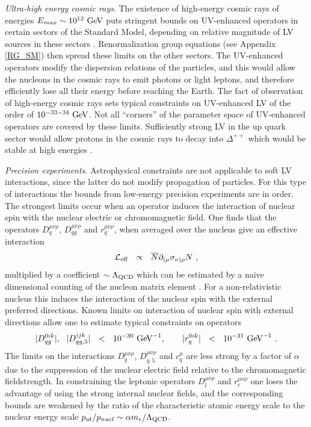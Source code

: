 \documentclass[12pt,preprintnumbers,nofootinbib]{revtex4}
\newcommand{\ov}{\overline}
\newcommand{\GeV}{{\rm GeV}}
\newcommand{\Leff}{{\mathcal{L}_{\rm eff}}}
\newcommand{\LQCD}{{\Lambda_{\rm QCD}}}
\begin{document}
	{\it Ultra-high energy cosmic rays}. 
	The existence of high-energy cosmic rays of energies $ E_{max} \sim 10^{12}~\GeV $ puts
	stringent bounds on UV-enhanced operators in certain sectors of the Standard Model, 
	depending on relative magnitude of LV sources in these sectors
	\cite{Gagnon:2004xh}. 
	Renormalization group equations (see Appendix \ref{RG_SM}) then spread these limits on the 
	other sectors.
	The UV-enhanced operators modify the dispersion relations of the particles, and this would 
	allow the nucleons in the cosmic rays to emit photons or light leptons, and therefore
	efficiently  lose all their energy before reaching the Earth. 
	The fact of observation of high-energy cosmic rays sets typical constraints on UV-enhanced
	LV of the order of $ 10^{-33-34}~\GeV $. 
	Not all ``corners'' of the parameter space of UV-enhanced operators are covered by these
	limits.
	Sufficiently strong LV in the up quark sector would allow protons in the cosmic
	rays to decay into $ \Delta^{++} $ which would be stable at high energies
	\cite{Gagnon:2004xh}.
	
	{\it Precision experiments}. 
	Astrophysical constraints are not applicable to soft LV interactions, since the latter do not
	modify propagation of particles.
	For this type of interactions the bounds from low-energy precision experiments are in order.
	The strongest limits occur when an operator induces the interaction 
	of nuclear spin with the nuclear electric 
	or chromomagnetic field. 
	One finds that the operators $ D_q^{\mu\nu\rho} $, $ D_{qg}^{\mu\nu\rho} $ 
	and $ r_q^{\mu\nu\rho} $, 
	when averaged over the nucleus give an effective interaction
\[
	\Leff ~~\propto~~ \ov{N} \partial_{(\mu} \sigma_{\nu)\rho} N ~,
\]
	multiplied by a coefficient $ \sim \LQCD $ which can be estimated by a naive dimensional
	counting of the nucleon matrix element
\cite{Manohar:1983md}.
	For a non-relativistic nucleus this induces the interaction of the nuclear spin with
	the external preferred directions.
	Known limits
\cite{Berglund:}
	on interaction of nuclear spin with external directions allow one to estimate typical
	constraints on operators
\[
	| D_{qg}^{0ik} |, ~~| D_{qg,5}^{ijk} |  ~~<~~ 10^{-30}~\GeV^{-1},
	\qquad
	| r_q^{0ik} | ~~<~~ 10^{-31}~\GeV^{-1}~.
\]
	The limits on the interactions $ D_q^{\mu\nu\rho} $, $ D_{q,5}^{\mu\nu\rho} $ and
	$ c_q^\mu $ are less strong by a factor of $ \alpha $ due to the suppression of the
	nuclear electric field relative to the chromomagnetic fieldstrength.
	In constraining the leptonic operators $ D_l^{\mu\nu\rho} $ and $ r_e^{\mu\nu\rho} $ one
	loses the advantage of using the strong internal nuclear fields, 
	and the corresponding bounds are weakened by the ratio of the characteristic atomic 
	energy scale to the nuclear energy scale $ p_{at}/p_{nucl} \sim \alpha m_e / \LQCD $.
\end{document}

